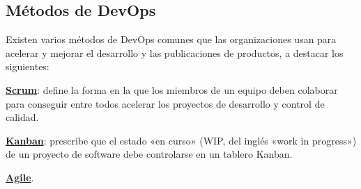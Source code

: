 \subsection{Métodos de DevOps}
Existen varios métodos de DevOps comunes que las organizaciones usan para acelerar y mejorar el desarrollo y las publicaciones de productos, a destacar los siguientes:
\begin{compactitem}
    \item \textbf{\underline{Scrum}}: define la forma en la que los miembros de un equipo deben colaborar para conseguir entre todos acelerar los proyectos de desarrollo y control de calidad.
    \item \textbf{\underline{Kanban}}: prescribe que el estado «en curso» (WIP, del inglés «work in progress») de un proyecto de software debe controlarse en un tablero Kanban.
    \item \textbf{\underline{Agile}}.
\end{compactitem}

